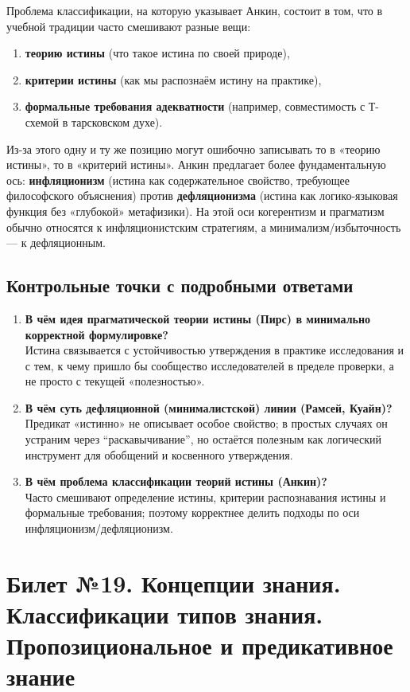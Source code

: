 \documentclass[a4paper,12pt]{article}
\begin{document}
Проблема классификации, на которую указывает Анкин, состоит в том, что в учебной традиции часто смешивают разные вещи:
\begin{enumerate}
    \item \textbf{теорию истины} (что такое истина по своей природе),
    \item \textbf{критерии истины} (как мы распознаём истину на практике),
    \item \textbf{формальные требования адекватности} (например, совместимость с Т-схемой в тарсковском духе).
\end{enumerate}
Из-за этого одну и ту же позицию могут ошибочно записывать то в «теорию истины», то в «критерий истины». Анкин предлагает более фундаментальную ось: \textbf{инфляционизм} (истина как содержательное свойство, требующее философского объяснения) против \textbf{дефляционизма} (истина как логико-языковая функция без «глубокой» метафизики). На этой оси когерентизм и прагматизм обычно относятся к инфляционистским стратегиям, а минимализм/избыточность --- к дефляционным.

\subsection{Контрольные точки с подробными ответами}

\begin{enumerate}
    \item \textbf{В чём идея прагматической теории истины (Пирс) в минимально корректной формулировке?}\\
    Истина связывается с устойчивостью утверждения в практике исследования и с тем, к чему пришло бы сообщество исследователей в пределе проверки, а не просто с текущей «полезностью».
    \item \textbf{В чём суть дефляционной (минималистской) линии (Рамсей, Куайн)?}\\
    Предикат «истинно» не описывает особое свойство; в простых случаях он устраним через ``раскавычивание'', но остаётся полезным как логический инструмент для обобщений и косвенного утверждения.
    \item \textbf{В чём проблема классификации теорий истины (Анкин)?}\\
    Часто смешивают определение истины, критерии распознавания истины и формальные требования; поэтому корректнее делить подходы по оси инфляционизм/дефляционизм.
\end{enumerate}

\newpage
\section{Билет №19. Концепции знания. Классификации типов знания. Пропозициональное и предикативное знание}
\end{document}
